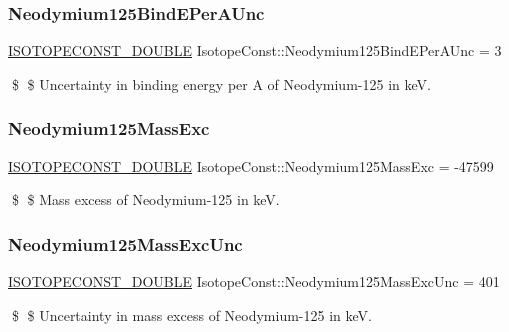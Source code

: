 \subsubsection{\texorpdfstring{Neodymium125\+Bind\+E\+Per\+A\+Unc}{Neodymium125BindEPerAUnc}}
{\footnotesize\ttfamily \mbox{\hyperlink{group___isotope_const-_macros_ga8f45a7272ce02c0b4c65c44636ed719a}{I\+S\+O\+T\+O\+P\+E\+C\+O\+N\+S\+T\+\_\+\+D\+O\+U\+B\+LE}} Isotope\+Const\+::\+Neodymium125\+Bind\+E\+Per\+A\+Unc = 3}

\$ \$ Uncertainty in binding energy per A of Neodymium-\/125 in keV. \mbox{\label{group___isotope_const-_neodymium-_nd125_gaa884364cc09eba6bd7e4e91a40a567a0}} 
\subsubsection{\texorpdfstring{Neodymium125\+Mass\+Exc}{Neodymium125MassExc}}
{\footnotesize\ttfamily \mbox{\hyperlink{group___isotope_const-_macros_ga8f45a7272ce02c0b4c65c44636ed719a}{I\+S\+O\+T\+O\+P\+E\+C\+O\+N\+S\+T\+\_\+\+D\+O\+U\+B\+LE}} Isotope\+Const\+::\+Neodymium125\+Mass\+Exc = -\/47599}

\$ \$ Mass excess of Neodymium-\/125 in keV. \mbox{\label{group___isotope_const-_neodymium-_nd125_gad7a9a91a6eeff07047fdf747374acb2a}} 
\subsubsection{\texorpdfstring{Neodymium125\+Mass\+Exc\+Unc}{Neodymium125MassExcUnc}}
{\footnotesize\ttfamily \mbox{\hyperlink{group___isotope_const-_macros_ga8f45a7272ce02c0b4c65c44636ed719a}{I\+S\+O\+T\+O\+P\+E\+C\+O\+N\+S\+T\+\_\+\+D\+O\+U\+B\+LE}} Isotope\+Const\+::\+Neodymium125\+Mass\+Exc\+Unc = 401}

\$ \$ Uncertainty in mass excess of Neodymium-\/125 in keV. \mbox{\label{group___isotope_const-_neodymium-_nd125_gad42e709144095c8ca70efe39ec8c4242}} 
